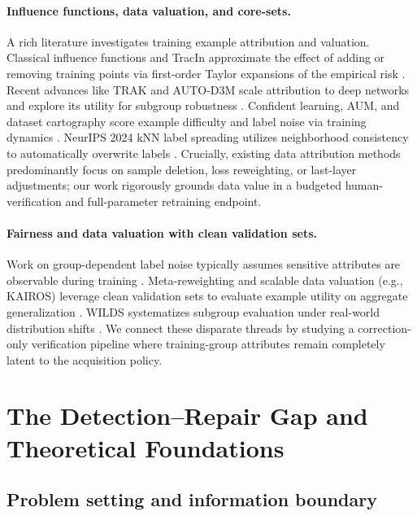 \documentclass{article}
\begin{document}
\paragraph{Influence functions, data valuation, and core-sets.}
A rich literature investigates training example attribution and valuation. Classical influence functions and TracIn approximate the effect of adding or removing training points via first-order Taylor expansions of the empirical risk \citep{koh2017influence,pruthi2020tracin}. Recent advances like TRAK and AUTO-D3M scale attribution to deep networks and explore its utility for subgroup robustness \citep{park2023trak,jain2024improving}. Confident learning, AUM, and dataset cartography score example difficulty and label noise via training dynamics \citep{northcutt2021confident,pleiss2020aum,swayamdipta2020dataset}. NeurIPS 2024 kNN label spreading utilizes neighborhood consistency to automatically overwrite labels \citep{stromberg2024enhancing}. Crucially, existing data attribution methods predominantly focus on sample deletion, loss reweighting, or last-layer adjustments; our work rigorously grounds data value in a budgeted human-verification and full-parameter retraining endpoint.

\paragraph{Fairness and data valuation with clean validation sets.}
Work on group-dependent label noise typically assumes sensitive attributes are observable during training \citep{wang2021fair}. Meta-reweighting and scalable data valuation (e.g., KAIROS) leverage clean validation sets to evaluate example utility on aggregate generalization \citep{ren2018reweight,zhu2025kairos}. WILDS systematizes subgroup evaluation under real-world distribution shifts \citep{koh2021wilds}. We connect these disparate threads by studying a correction-only verification pipeline where training-group attributes remain completely latent to the acquisition policy.

\section{The Detection--Repair Gap and Theoretical Foundations}
\label{sec:problem_theory}

\subsection{Problem setting and information boundary}
\label{sec:problem}
\end{document}
